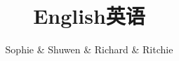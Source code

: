 \documentclass[12pt,twiside,a4paper]{ctexbook}
\numberwithin{chapter}{part}
\begin{document}

\author
{
Sophie \& Shuwen \& Richard \& Ritchie
}


\title{English英语}
\maketitle
\tableofcontents %
\newpage
\pagestyle{fancy}
\end{document}

